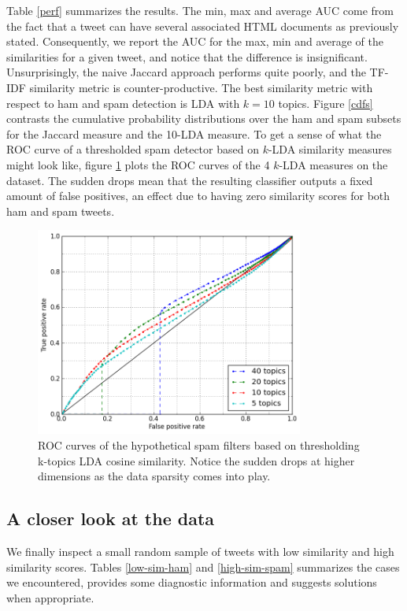 \documentclass[times, 11pt, twocolumn]{article}
\begin{document}
Table \ref{perf} summarizes the results. The min, max and average AUC come from the fact that a tweet can
have several associated HTML documents as previously stated. Consequently, we report the AUC for the
max, min and average of the similarities for a given tweet, and notice that the difference is insignificant. 
Unsurprisingly, the naive Jaccard approach performs quite poorly, and the TF-IDF similarity 
metric is counter-productive. The best similarity metric with respect to ham and spam detection is 
LDA with $k=10$ topics. Figure \ref{cdfs} contrasts the cumulative 
probability distributions over the ham and spam subsets for the Jaccard measure and the 10-LDA measure. To get
a sense of what the ROC curve of a thresholded spam detector based on $k$-LDA similarity measures might look like,
figure \ref{roc} plots the ROC curves of the 4 $k$-LDA measures on the dataset. The sudden drops mean that the
resulting classifier outputs a fixed amount of false positives, an effect due to having zero similarity scores 
for both ham and spam tweets.

\begin{figure}[ht]\centering
	\includegraphics[width=8.8cm]{roc_lda_sim.png}
	\caption{ROC curves of the hypothetical spam filters based on thresholding k-topics LDA cosine
	similarity. Notice the sudden drops at higher dimensions as the data sparsity comes into play.}
	\label{roc}
\end{figure}

\subsection{A closer look at the data}
We finally inspect a small random sample of tweets with low similarity and high similarity scores. Tables \ref{low-sim-ham} 
and \ref{high-sim-spam} summarizes the cases we encountered, provides some diagnostic information and suggests 
solutions when appropriate.
\end{document}
